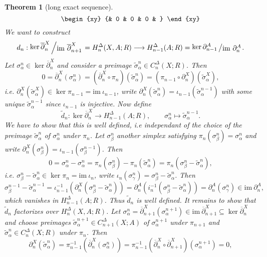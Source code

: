 \documentclass[11pt]{book}
\numberwithin{dummy}{section}
\newtheorem{theorem}{Theorem}[section]
\theoremstyle{nonumberbreak}
\newenvironment{pr}[1][]{\ifthenelse{\equal{#1}{}}{\proof}{\proof[#1]}\rm}{\endproof}
\newcommand{\la}{\longrightarrow}
\newcommand{\slant}[2]{{\raisebox{.1em}{$#1$}\left/\raisebox{-.1em}{$#2$}\right.}}
\begin{document}
\begin{spacing}{1.4}
\begin{theorem}[long exact sequence]
\begin{pr}
$$\begin{xy}
{& 0 & 0 & 0 & 
}
\end{xy}
$$
We want to construct
$$d_n: \slant{\ker \overline{\partial}_n^X}{ \mathrm{im} \ \overline{\partial}^X_{n+1}} = H_{n}^{\Delta}(X,A;R) \la H_{n-1}^{\Delta}(A;R) = \slant{\ker \partial_{n-1}^{A}}{\mathrm{im} \ \partial_n^{A}}.$$
Let $\sigma_{\alpha}^n \in \ker \overline{\partial}_n^X$ and consider a preimage $\tilde{\sigma}_{\alpha}^n \in C_n^{\Delta}(X;R)$. Then 
$$0=\overline{\partial}_n^X(\sigma_{\alpha}^n) = \left( \overline{\partial}_n^X \circ \pi_n\right) \left( \tilde{\sigma}_{\alpha}^n \right) = \left( \pi_{n-1} \circ \partial_n^X\right) \left( \tilde{\sigma}_{\alpha}^X\right),$$
i.e. $\partial_n^X(\tilde{\sigma}_{\alpha}^X) \in \ker \pi_{n-1} = \mathrm{im} \ \iota_{n-1}$, write $\partial_n^X(\tilde{\sigma}_{\alpha}^n) = \iota_{n-1}(\tilde{\sigma}_{\alpha}^{n-1})$ with some unique $\tilde{\sigma}_{\alpha}^{n-1}$ since $\iota_{n-1}$ is injective. Now define
$$\tilde{d}_n: \ker \overline{\partial}_n^X \la H_{n-1}^{\Delta}(A;R), \qquad \sigma_{\alpha}^n \mapsto \tilde{\sigma}_{\alpha}^{n-1}.$$
We have to show that this is well defined, i.e independant of the choice of the preimage $\tilde{\sigma}_{\alpha}^n$ of $\sigma_{\alpha}^n$ under $\pi_n$. Let $\sigma_{\beta}^n$ another simplex satisfying $\pi_n(\sigma_{\beta}^n)=\sigma_{\alpha}^n$ and write $\partial_n^X(\sigma_{\beta}^n) = \iota_{n-1}(\sigma_{\beta}^{n-1})$. Then
$$0= \sigma_{\alpha}^n- \sigma_{\alpha}^n =\pi_n(\sigma_{\beta}^n) - \pi_n(\tilde{\sigma}_{\alpha}^n) =  \pi_n(\sigma_{\beta}^n - \tilde{\sigma}_{\alpha}^n),$$
i.e. $\sigma_{\beta}^n - \tilde{\sigma}_{\alpha}^n \in \ker \pi_n = \mathrm{im} \ \iota_n$, write $\iota_n(\sigma_{\gamma}^n) = \sigma_{\beta}^n - \tilde{\sigma}_{\alpha}^n$. Then
$$\sigma_{\beta}^{n-1} - \tilde{\sigma}_{\alpha}^{n-1} = \iota_{n-1}^{-1}\left(\partial_n^X(\sigma_{\beta}^{n}- \tilde{\sigma}_{\alpha}^n)\right) =\partial_n^{A} \left( i_n^{-1}(\sigma_{\beta}^n - \tilde{\sigma}_{\alpha}^n) \right) = \partial_n^{A} \left( \sigma_{\gamma}^n\right) \in \mathrm{im} \ \partial_n^{A},$$
 which vanishes in $H_{n-1}^{\Delta}(A;R)$. Thus $\tilde{d}_n$ is well defined. It remains to show that $\tilde{d}_n$ factorizes over $H_n^{\Delta}(X,A;R)$. Let $\sigma_{\alpha}^n = \overline{\partial}^X_{n+1}(\sigma_{\alpha}^{n+1}) \in \mathrm{im} \ \overline{\partial}^X_{n+1} \subseteq \ker \overline{\partial}_n^X$ and choose preimages $\tilde{\sigma}_{\alpha}^{n+1} \in C_{n+1}^{\Delta}(X;A)$ of $\sigma_{\alpha}^{n+1}$ under $\pi_{n+1}$ and $\tilde{\sigma}_{\alpha}^n \in C_n^{\Delta}(X;R)$ under $\pi_n$. Then 
$$\partial_n^X\left( \tilde{\sigma}_{\alpha}^n\right) = \pi_{n-1}^{-1}\left( \overline{\partial}_n^X(\sigma_{\alpha}^n)\right) = \pi_{n-1}^{-1} \left( \overline{\partial}_n^X \circ \overline{\partial}_{n+1}^X \right)(\sigma_{\alpha}^{n+1}) = 0,$$

\end{pr}
\end{theorem}
\end{spacing}
\end{document}
